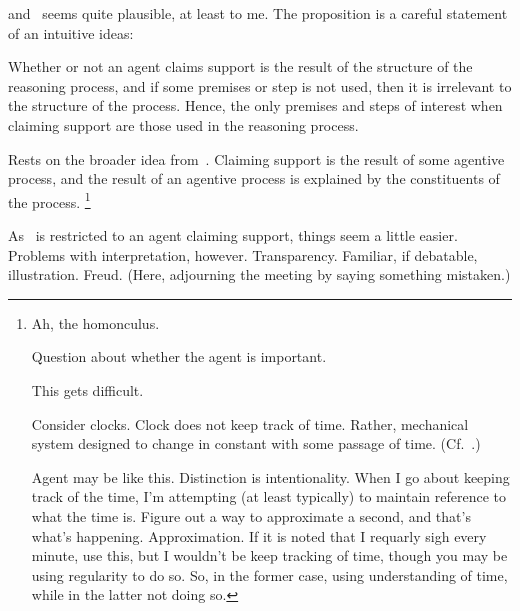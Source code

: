 \begin{note}[Intuition]
  \ESU{} and~\gESU{} seems quite plausible, at least to me.
  The proposition is a careful statement of an intuitive ideas:

  Whether or not an agent claims support is the result of the structure of the reasoning process, and if some premises or step is not used, then it is irrelevant to the structure of the process.
  Hence, the only premises and steps of interest when claiming support are those used in the reasoning process.

  Rests on the broader idea from~\gESU{}.
  Claiming support is the result of some agentive process, and the result of an agentive process is explained by the constituents of the process.\nolinebreak
  \footnote{
    Ah, the homonculus.

    Question about whether the agent is important.

    This gets difficult.

    Consider clocks.
    Clock does not keep track of time.
    Rather, mechanical system designed to change in constant with some passage of time. (Cf.\ \textcite{Smith:1988aa}.)

    Agent may be like this.
    Distinction is intentionality.
    When I go about keeping track of the time, I'm attempting (at least typically) to maintain reference to what the time is.
    Figure out a way to approximate a second, and that's what's happening.
    Approximation.
    If it is noted that I requarly sigh every minute, use this, but I wouldn't be keep tracking of time, though you may be using regularity to do so.
    So, in the former case, using understanding of time, while in the latter not doing so.
  }

  As~\gESU{} is restricted to an agent claiming support, things seem a little easier.
  Problems with interpretation, however.
  Transparency.
  Familiar, if debatable, illustration.
  Freud.
  (Here, adjourning the meeting by saying something mistaken.)
\end{note}

